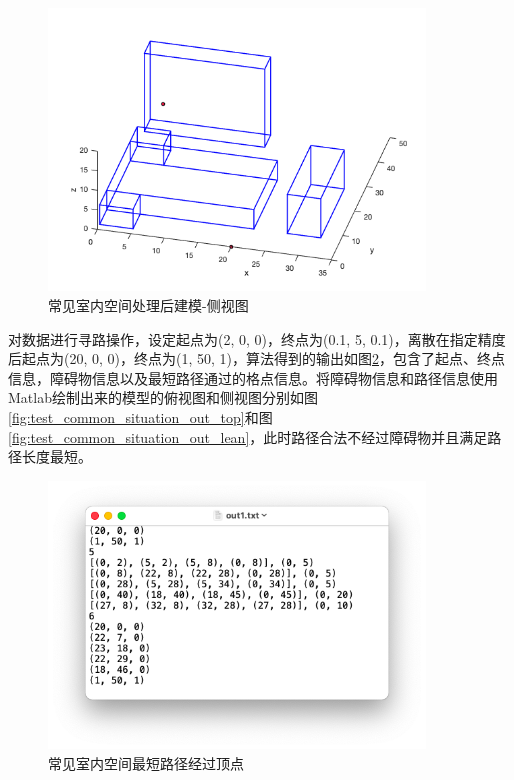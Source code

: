 \begin{figure}[htb]
    \centering
    \caption{常见室内空间处理后建模-侧视图}
    \label{fig:test_common_situation_pic_lean}
    \includegraphics[width=10cm]{figures/test_common_situation_pic_lean.png}
\end{figure}
对数据进行寻路操作，设定起点为(2, 0, 0)，终点为(0.1, 5, 0.1)，离散在指定精度后起点为(20, 0, 0)，终点为(1, 50, 1)，算法得到的输出如图\ref{fig:test_common_situation_out}，包含了起点、终点信息，障碍物信息以及最短路径通过的格点信息。将障碍物信息和路径信息使用Matlab绘制出来的模型的俯视图和侧视图分别如图\ref{fig:test_common_situation_out_top}和图\ref{fig:test_common_situation_out_lean}，此时路径合法不经过障碍物并且满足路径长度最短。
\begin{figure}[htb]
    \centering
    \caption{常见室内空间最短路径经过顶点}
    \label{fig:test_common_situation_out}
    \includegraphics[width=10cm]{figures/test_common_situation_out.png}
\end{figure}

